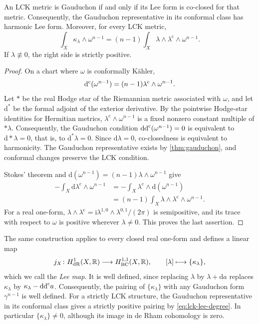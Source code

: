 \begin{proposition}\label{prop:lck-gauduchon}
An LCK metric is Gauduchon if and only if its Lee form is co-closed for that metric. Consequently, the Gauduchon representative in its conformal class has harmonic Lee form. Moreover, for every LCK metric,
\begin{equation}\label{eq:lck-lee-degree}
 \int_X\kappa_\lambda\wedge\omega^{n-1}
 =(n-1)\int_X\lambda\wedge\lambda^{\mathrm c}\wedge\omega^{n-1}.
\end{equation}
If $\lambda\not\equiv0$, the right side is strictly positive.
\end{proposition}
\begin{proof}
On a chart where $\omega$ is conformally K\"ahler,
\[
 \mathrm d^{\mathrm c}(\omega^{n-1})
 =(n-1)\lambda^{\mathrm c}\wedge\omega^{n-1}.
\]
Let $*$ be the real Hodge star of the Riemannian metric associated with $\omega$, and let $\mathrm d^*$ be the formal adjoint of the exterior derivative. By the pointwise Hodge-star identities for Hermitian metrics, $\lambda^{\mathrm c}\wedge\omega^{n-1}$ is a fixed nonzero constant multiple of $*\lambda$. Consequently, the Gauduchon condition $\mathrm{dd}^{\mathrm{c}}(\omega^{n-1})=0$ is equivalent to $\mathrm{d}*\lambda=0$, that is, to $\mathrm{d}^*\lambda=0$. Since $\mathrm{d}\lambda=0$, co-closedness is equivalent to harmonicity. The Gauduchon representative exists by \cref{thm:gauduchon}, and conformal changes preserve the LCK condition.

Stokes' theorem and $\mathrm{d}(\omega^{n-1})=(n-1)\lambda\wedge\omega^{n-1}$ give
\[
 \begin{split}
 -\int_X\mathrm{d}\lambda^{\mathrm c}\wedge\omega^{n-1}
 &=-\int_X\lambda^{\mathrm c}\wedge\mathrm{d}(\omega^{n-1})\\
 &=(n-1)\int_X\lambda\wedge\lambda^{\mathrm c}\wedge\omega^{n-1}.
 \end{split}
\]
For a real one-form,
$\lambda\wedge\lambda^{\mathrm c}
=\mathrm i\lambda^{1,0}\wedge\lambda^{0,1}/(2\pi)$ is semipositive, and its trace with respect to $\omega$ is positive wherever $\lambda\ne0$. This proves the last assertion.
\end{proof}

The same construction applies to every closed real one-form and defines a linear map
\begin{equation}\label{eq:lck-lee-bc-map}
 j_X\colon H^1_{\mathrm{dR}}(X,\mathbb R)\longrightarrow H^{1,1}_{\mathrm{BC}}(X,\mathbb R),
 \qquad [\lambda]\longmapsto\{\kappa_\lambda\},
\end{equation}
which we call the \emph{Lee map}. It is well defined, since replacing $\lambda$ by $\lambda+\mathrm{d}a$ replaces $\kappa_\lambda$ by $\kappa_\lambda-\mathrm{dd}^{\mathrm{c}} a$. Consequently, the pairing of $\{\kappa_\lambda\}$ with any Gauduchon form $\gamma^{n-1}$ is well defined. For a strictly LCK structure, the Gauduchon representative in its conformal class gives a strictly positive pairing by \eqref{eq:lck-lee-degree}. In particular $\{\kappa_\lambda\}\ne0$, although its image in de Rham cohomology is zero.

